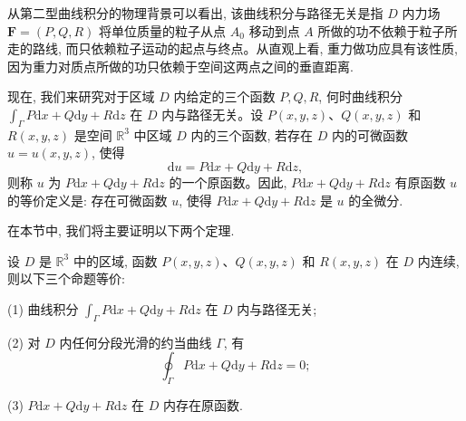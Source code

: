 从第二型曲线积分的物理背景可以看出, 该曲线积分与路径无关是指 $D$ 内力场 $\boldsymbol F=(P,Q,R)$ 将单位质量的粒子从点 $A_0$ 移动到点 $A$ 所做的功不依赖于粒子所走的路线, 而只依赖粒子运动的起点与终点。从直观上看, 重力做功应具有该性质, 因为重力对质点所做的功只依赖于空间这两点之间的垂直距离.

现在, 我们来研究对于区域 $D$ 内给定的三个函数 $P,Q,R$, 何时曲线积分 $\int_\Gamma P\mathrm dx+Q\mathrm dy+R\mathrm dz$ 在 $D$ 内与路径无关。设 $P(x,y,z)$、$Q(x,y,z)$ 和 $R(x,y,z)$ 是空间 $\mathbb R^3$ 中区域 $D$ 内的三个函数, 若存在 $D$ 内的可微函数 $u=u(x,y,z)$, 使得
\[
  \mathrm du=P\mathrm dx+Q\mathrm dy+R\mathrm dz,
\]
则称 $u$ 为 $P\mathrm dx+Q\mathrm dy+R\mathrm dz$ 的一个原函数。因此, $P\mathrm dx+Q\mathrm dy+R\mathrm dz$ 有原函数 $u$ 的等价定义是: 存在可微函数 $u$, 使得 $P\mathrm dx+Q\mathrm dy+R\mathrm dz$ 是 $u$ 的全微分.

在本节中, 我们将主要证明以下两个定理.

\begin{theorem}\label{theorem:ma-16-7-1}
设 $D$ 是 $\mathbb R^3$ 中的区域, 函数 $P(x,y,z)$、$Q(x,y,z)$ 和 $R(x,y,z)$ 在 $D$ 内连续, 则以下三个命题等价:

(1) 曲线积分 $\int_\Gamma P\mathrm dx+Q\mathrm dy+R\mathrm dz$ 在 $D$ 内与路径无关;

(2) 对 $D$ 内任何分段光滑的约当曲线 $\Gamma$, 有
\[
  \oint_\Gamma P\mathrm dx+Q\mathrm dy+R\mathrm dz=0;
\]

(3) $P\mathrm dx+Q\mathrm dy+R\mathrm dz$ 在 $D$ 内存在原函数.
\end{theorem}


